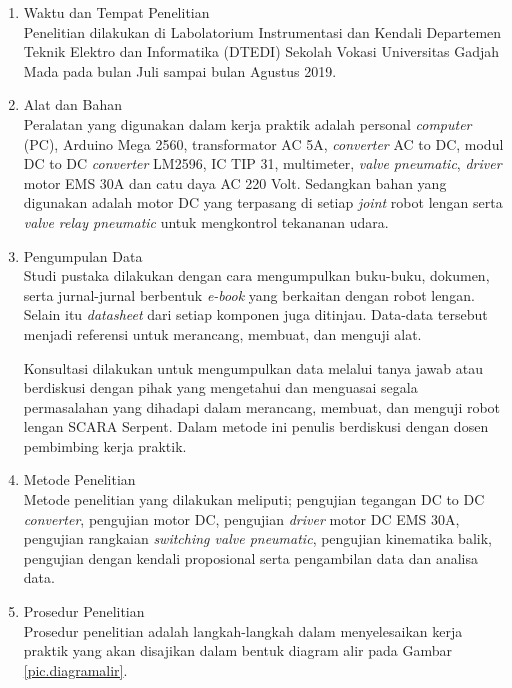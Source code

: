 \begin{enumerate}
	\item Waktu dan Tempat Penelitian \\
	Penelitian dilakukan di Labolatorium Instrumentasi dan Kendali Departemen Teknik Elektro dan Informatika (DTEDI) Sekolah Vokasi Universitas Gadjah Mada pada bulan Juli sampai bulan Agustus 2019.
	
	\item Alat dan Bahan \\
	Peralatan yang digunakan dalam kerja praktik adalah personal \textit{computer} (PC), Arduino Mega 2560, transformator AC 5A, \textit{converter} AC to DC, modul DC to DC \textit{converter} LM2596, IC TIP 31, multimeter,\textit{ valve pneumatic}, \textit{driver} motor EMS 30A dan catu daya AC 220 Volt. Sedangkan bahan yang digunakan adalah motor DC yang terpasang di setiap \emph {joint} robot lengan serta \textit{valve relay pneumatic} untuk mengkontrol tekananan udara.
	
	\item  Pengumpulan Data \\
	Studi pustaka dilakukan dengan cara mengumpulkan buku-buku, dokumen, serta jurnal-jurnal berbentuk \emph{e-book} yang berkaitan dengan robot lengan. Selain itu \emph{datasheet} dari setiap komponen juga ditinjau. Data-data tersebut menjadi referensi untuk merancang, membuat, dan menguji alat. 
	
	Konsultasi dilakukan untuk mengumpulkan data melalui tanya jawab atau berdiskusi dengan pihak yang mengetahui dan menguasai segala permasalahan yang dihadapi dalam merancang, membuat, dan menguji robot lengan SCARA Serpent. Dalam metode ini penulis berdiskusi dengan dosen pembimbing kerja praktik. 
	
	\item Metode Penelitian \\
	Metode penelitian yang dilakukan meliputi; pengujian tegangan DC to DC \textit{converter}, pengujian motor DC, pengujian \textit{driver} motor DC EMS 30A, pengujian rangkaian \textit{switching valve pneumatic}, pengujian kinematika balik, pengujian dengan kendali proposional serta pengambilan data dan analisa data.
	
	\item Prosedur Penelitian\\
	Prosedur penelitian adalah langkah-langkah dalam menyelesaikan kerja praktik yang akan disajikan dalam bentuk diagram alir pada Gambar \ref{pic.diagramalir}.
	

\end{enumerate}

